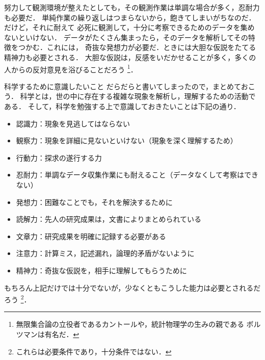             努力して観測環境が整えたとしても，その観測作業は単調な場合が多く，忍耐力も必要だ．
            単純作業の繰り返しはつまらないから，飽きてしまいがちなのだ．だけど，それに耐えて
            必死に観測して，十分に考察できるためのデータを集めないといけない．
            データがたくさん集まったら，そのデータを解析してその特徴をつかむ．これには，
            奇抜な発想力が必要だ．ときには大胆な仮説をたてる精神力も必要とされる．
            大胆な仮説は，反感をいだかせることが多く，多くの人からの反対意見を浴びることだろう
                \footnote{
                    無限集合論の立役者であるカントールや，統計物理学の生みの親である
                    ボルツマンは有名だ．
                }．

            \begin{memo}{科学するために意識したいこと}
                だらだらと書いてしまったので，まとめておこう．
                科学とは，世の中に存在する複雑な現象を解析し，理解するための活動である．
                そして，科学を勉強する上で意識しておきたいことは下記の通り．
                \begin{itemize}
                    \item 認識力：現象を見逃してはならない
                    \item 観察力：現象を詳細に見ないといけない（現象を深く理解するため）
                    \item 行動力：探求の遂行する力
                    \item 忍耐力：単調なデータ収集作業にも耐えること（データなくして考察はできない）
                    \item 発想力：困難なことでも，それを解決するために
                    \item 読解力：先人の研究成果は，文書によりまとめられている
                    \item 文章力：研究成果を明確に記録する必要がある
                    \item 注意力：計算ミス，記述漏れ，論理的矛盾がないように
                    \item 精神力：奇抜な仮説を，相手に理解してもらうために
                \end{itemize}

                もちろん上記だけでは十分でないが，少なくともこうした能力は必要とされるだろう
                    \footnote{
                        これらは必要条件であり，十分条件ではない．
                    }．
            \end{memo}

